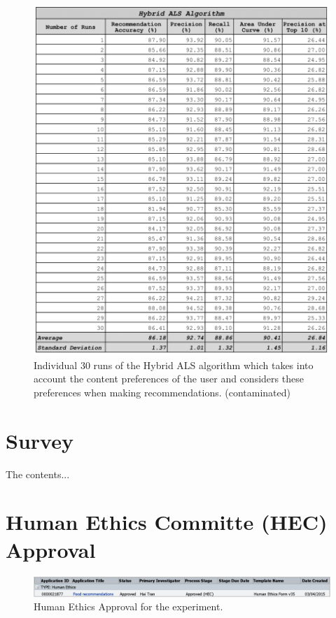 \begin{appendices}
\begin{figure}
\centering
\includegraphics[scale=0.3]{appendices/hybrid_als_30_runs.png}
\caption{Individual 30 runs of the Hybrid ALS algorithm which takes into account the content preferences of the user and considers these preferences when making recommendations. (contaminated)}
\label{fig:dual_algorithm}
\end{figure}

\chapter{Survey} \label{appendix:survey}

The contents...




\chapter{Human Ethics Committe (HEC) Approval} \label{appendix:hec}

\begin{figure} 
\centering
\includegraphics[scale=0.3]{appendices/hec_approval.png}
\caption{Human Ethics Approval for the experiment.}
\label{fig:hec_approval}
\end{figure}



\end{appendices}
